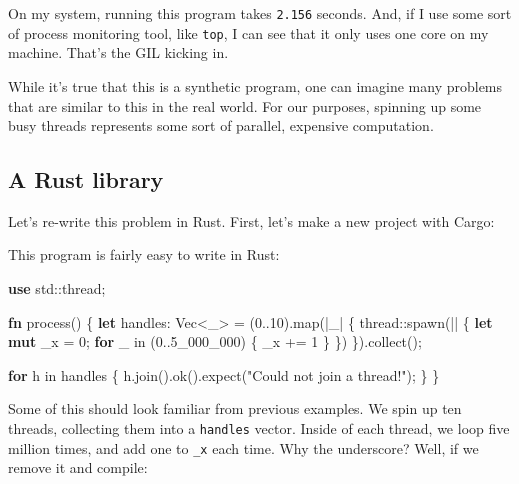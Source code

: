 \documentclass[a4paper,]{book}
\newenvironment{Shaded}{\begin{snugshade}}{\end{snugshade}}
\newcommand{\KeywordTok}[1]{\textcolor[rgb]{0.13,0.29,0.53}{\textbf{{#1}}}}
\newcommand{\DecValTok}[1]{\textcolor[rgb]{0.00,0.00,0.81}{{#1}}}
\newcommand{\StringTok}[1]{\textcolor[rgb]{0.31,0.60,0.02}{{#1}}}
\newcommand{\NormalTok}[1]{{#1}}
\begin{document}
On my system, running this program takes \texttt{2.156} seconds. And, if
I use some sort of process monitoring tool, like \texttt{top}, I can see
that it only uses one core on my machine. That's the GIL kicking in.

While it's true that this is a synthetic program, one can imagine many
problems that are similar to this in the real world. For our purposes,
spinning up some busy threads represents some sort of parallel,
expensive computation.

\subsection{A Rust library}\label{a-rust-library}

Let's re-write this problem in Rust. First, let's make a new project
with Cargo:

\begin{Shaded}
\end{Shaded}

This program is fairly easy to write in Rust:

\begin{Shaded}
\begin{Highlighting}[]
\KeywordTok{use} \NormalTok{std::thread;}

\KeywordTok{fn} \NormalTok{process() \{}
    \KeywordTok{let} \NormalTok{handles: Vec<_> = (}\DecValTok{0.}\NormalTok{.}\DecValTok{10}\NormalTok{).map(|_| \{}
        \NormalTok{thread::spawn(|| \{}
            \KeywordTok{let} \KeywordTok{mut} \NormalTok{_x = }\DecValTok{0}\NormalTok{;}
            \KeywordTok{for} \NormalTok{_ in (}\DecValTok{0.}\NormalTok{.}\DecValTok{5_000_000}\NormalTok{) \{}
                \NormalTok{_x += }\DecValTok{1}
            \NormalTok{\}}
        \NormalTok{\})}
    \NormalTok{\}).collect();}

    \KeywordTok{for} \NormalTok{h in handles \{}
        \NormalTok{h.join().ok().expect(}\StringTok{"Could not join a thread!"}\NormalTok{);}
    \NormalTok{\}}
\NormalTok{\}}
\end{Highlighting}
\end{Shaded}

Some of this should look familiar from previous examples. We spin up ten
threads, collecting them into a \texttt{handles} vector. Inside of each
thread, we loop five million times, and add one to \texttt{\_x} each
time. Why the underscore? Well, if we remove it and compile:
\end{document}
